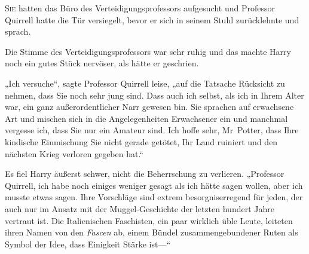 
\lettrine{S}{ie} hatten das Büro des Verteidigungsprofessors aufgesucht und Professor Quirrell hatte die Tür versiegelt, bevor er sich in seinem Stuhl zurücklehnte und sprach.

Die Stimme des Verteidigungsprofessors war sehr ruhig und das machte Harry noch ein gutes Stück nervöser, als hätte er geschrien.

„Ich versuche“, sagte Professor Quirrell leise, „auf die Tatsache Rücksicht zu nehmen, dass Sie noch sehr jung sind. Dass auch ich selbst, als ich in Ihrem Alter war, ein ganz außerordentlicher Narr gewesen bin. Sie sprachen auf erwachsene Art und mischen sich in die Angelegenheiten Erwachsener ein und manchmal vergesse ich, dass Sie nur ein Amateur sind. Ich hoffe sehr, Mr~Potter, dass Ihre kindische Einmischung Sie nicht gerade getötet, Ihr Land ruiniert und den nächsten Krieg verloren gegeben hat.“

Es fiel Harry äußerst schwer, nicht die Beherrschung zu verlieren. „Professor Quirrell, ich habe noch einiges weniger gesagt als ich hätte sagen wollen, aber ich musste etwas sagen. Ihre Vorschläge sind extrem besorgniserregend für jeden, der auch nur im Ansatz mit der Muggel-Geschichte der letzten hundert Jahre vertraut ist. Die Italienischen Faschisten, ein paar wirklich üble Leute, leiteten ihren Namen von den \emph{Fascen} ab, einem Bündel zusammengebundener Ruten als Symbol der Idee, dass Einigkeit Stärke ist—“

